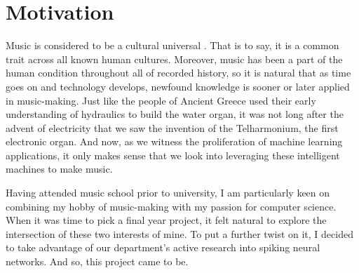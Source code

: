 \documentclass[../../report.tex]{subfiles}
\begin{document}
\section{Motivation}

Music is considered to be a cultural universal \cite{Mehr2019}. That is to say,
it is a common trait across all known human cultures. Moreover, music has been a
part of the human condition throughout all of recorded history, so it is natural
that as time goes on and technology develops, newfound knowledge is sooner or
later applied in music-making. Just like the people of Ancient Greece used their
early understanding of hydraulics to build the water organ, it was not long
after the advent of electricity that we saw the invention of the Telharmonium,
the first electronic organ. And now, as we witness the proliferation of machine
learning applications, it only makes sense that we look into leveraging these
intelligent machines to make music.

Having attended music school prior to university, I am particularly keen on
combining my hobby of music-making with my passion for computer science. When it
was time to pick a final year project, it felt natural to explore the
intersection of these two interests of mine. To put a further twist on it, I
decided to take advantage of our department's active research into spiking
neural networks. And so, this project came to be.
\end{document}
